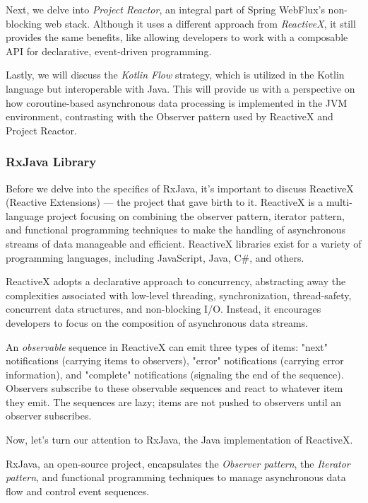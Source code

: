 Next, we delve into \textit{Project Reactor}, an integral part of Spring WebFlux's non-blocking web stack. Although it uses a different approach from \textit{ReactiveX}, it still provides the same benefits, like allowing developers to work with a composable API for declarative, event-driven programming.

Lastly, we will discuss the \textit{Kotlin Flow} strategy, which is utilized in the Kotlin language but interoperable with Java. This will provide us with a perspective on how coroutine-based asynchronous data processing is implemented in the JVM environment, contrasting with the Observer pattern used by ReactiveX and Project Reactor.


\subsubsection{RxJava Library}
\label{rxjava}

Before we delve into the specifics of RxJava, it's important to discuss ReactiveX (Reactive Extensions) — the project that gave birth to it. ReactiveX is a multi-language project focusing on combining the observer pattern, iterator pattern, and functional programming techniques to make the handling of asynchronous streams of data manageable and efficient. ReactiveX libraries exist for a variety of programming languages, including JavaScript, Java, C\#, and others.

ReactiveX adopts a declarative approach to concurrency, abstracting away the complexities associated with low-level threading, synchronization, thread-safety, concurrent data structures, and non-blocking I/O. Instead, it encourages developers to focus on the composition of asynchronous data streams.

An \textit{observable} sequence in ReactiveX can emit three types of items: "next" notifications (carrying items to observers), "error" notifications (carrying error information), and "complete" notifications (signaling the end of the sequence). Observers subscribe to these observable sequences and react to whatever item they emit. The sequences are lazy; items are not pushed to observers until an observer subscribes.

Now, let's turn our attention to RxJava, the Java implementation of ReactiveX.

RxJava, an open-source project, encapsulates the \textit{Observer pattern}, the \textit{Iterator pattern}, and functional programming techniques to manage asynchronous data flow and control event sequences.

